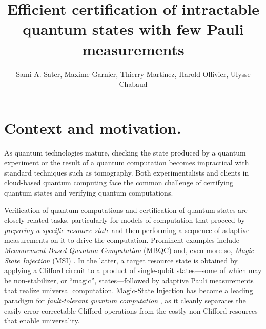 \documentclass[a4paper]{article}
\title{Efficient certification of intractable quantum states with few Pauli measurements}
\author{Sami A. Sater, Maxime Garnier, Thierry Martinez, Harold Ollivier, Ulysse Chabaud}
\begin{document}

\maketitle
\section{Context and motivation.}  
As quantum technologies mature, 
checking the state produced by a quantum experiment or the result of a quantum computation becomes impractical with standard techniques such as tomography.
Both experimentalists and  clients in cloud-based quantum computing face the common challenge of certifying quantum states and verifying quantum computations.

Verification of quantum computations and certification of quantum states are closely related tasks, particularly for models of computation that proceed by \emph{preparing a specific resource state} and then performing a sequence of adaptive measurements on it to drive the computation. 
Prominent examples include \emph{Measurement-Based Quantum Computation} (MBQC) \cite{RB01one, DKP07measurement, BBDR09measurement} and, even more so, \emph{Magic-State Injection} (MSI) \cite{BK04universal}. 
In the latter, a target resource state is obtained by applying a Clifford circuit to a product of single-qubit states---some of which may be non-stabilizer, or ``magic'', states---followed by adaptive Pauli measurements that realize universal computation. 
Magic-State Injection has become a leading paradigm for \emph{fault-tolerant quantum computation} \cite{DBMA25breaking, G23cleaner, AAAA22suppressing}, as it cleanly separates the easily error-correctable Clifford operations from the costly non-Clifford resources that enable universality.
\end{document}
